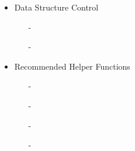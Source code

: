 \begin{itemize}
	      \pagebreak
	\item Data Structure Control
	      \begin{itemize}
		      \item[-] 
		      \item[-] 
	      \end{itemize}
	\item Recommended Helper Functions
	      \begin{itemize}
		      \item[-] 
		      \item[-] 
		      \item[-] 
		      \item[-] 
	      \end{itemize}
\end{itemize}

